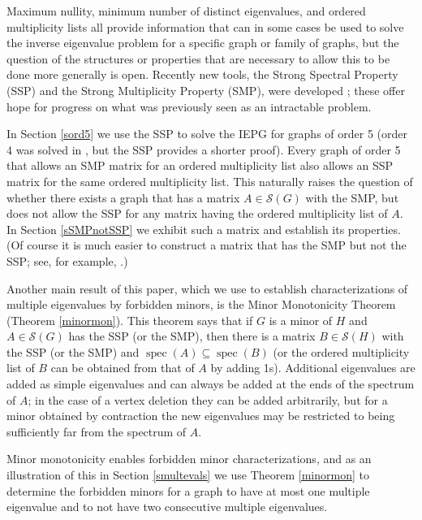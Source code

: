 \documentclass[11pt]{article}
\theoremstyle{definition}
\theoremstyle{definition}
\theoremstyle{definition}
\newcommand{\mptn}{\mathcal{S}} %
\def\spec{\operatorname{spec}}
\begin{document}
Maximum nullity, minimum number of distinct eigenvalues, and ordered multiplicity lists all provide information that can in some cases be used to solve the inverse eigenvalue problem for a specific graph or family of graphs, but the question of the structures or properties that are necessary  to allow this to be done more generally is open. Recently new tools,  the Strong Spectral Property (SSP) and the Strong Multiplicity Property (SMP), were developed \cite{genSAP}; these  offer hope for progress on what was previously seen as an intractable problem.

In Section \ref{sord5} we use the SSP to solve the IEPG for graphs of order 5 (order 4 was solved in \cite{BNSY14}, but the SSP provides a shorter proof).  
Every  graph of order 5 that allows an SMP matrix for an ordered multiplicity list also allows an SSP matrix for the same ordered multiplicity list. This naturally raises the question of whether there exists a graph that has a matrix $A\in\mptn(G)$ with the SMP, but does not allow the SSP for any matrix having  the ordered multiplicity list of $A$.  In Section \ref{sSMPnotSSP} we exhibit such a matrix and establish its properties.  (Of course it is much easier to construct a matrix that has the SMP but not the SSP; see, for example,  \cite[Remark~22]{genSAP}.)


Another  main result of this paper, which we use to establish characterizations of multiple eigenvalues by forbidden minors, is the Minor Monotonicity Theorem (Theorem \ref{minormon}).  This theorem says that if $G$ is a minor of $H$ and $A\in\mptn(G)$ has the SSP (or the SMP), then there is a matrix $B\in\mptn(H)$ with the SSP (or the SMP) and $\spec(A)\subseteq \spec(B)$ (or the ordered multiplicity list of $B$ can be obtained from that of $A$ by adding 1s).  Additional eigenvalues are added as simple eigenvalues and can always be added at the ends of the spectrum of $A$; in the case of a vertex deletion they can be added arbitrarily, but for a minor obtained by contraction the new eigenvalues may be restricted to being sufficiently far from the spectrum of $A$.

Minor monotonicity enables forbidden minor characterizations, and as an illustration of this  in Section \ref{smultevals} we use Theorem \ref{minormon} to determine the forbidden minors for a graph to have at most one multiple eigenvalue and to not have two consecutive multiple eigenvalues.   %
\end{document}
